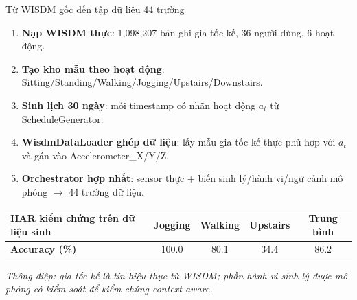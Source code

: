 \documentclass[11pt]{beamer}
\begin{document}
\begin{frame}{Từ WISDM gốc đến tập dữ liệu 44 trường}
\small
\begin{enumerate}
    \item \textbf{Nạp WISDM thực}: 1,098,207 bản ghi gia tốc kế, 36 người dùng, 6 hoạt động.
    \item \textbf{Tạo kho mẫu theo hoạt động}: Sitting/Standing/Walking/Jogging/Upstairs/Downstairs.
    \item \textbf{Sinh lịch 30 ngày}: mỗi timestamp có nhãn hoạt động $a_t$ từ ScheduleGenerator.
    \item \textbf{WisdmDataLoader ghép dữ liệu}: lấy mẫu gia tốc kế thực phù hợp với $a_t$ và gán vào Accelerometer\_X/Y/Z.
    \item \textbf{Orchestrator hợp nhất}: sensor thực + biến sinh lý/hành vi/ngữ cảnh mô phỏng $\rightarrow$ 44 trường dữ liệu.
\end{enumerate}

\vspace{0.05cm}
\begin{table}[h]
\centering
\scriptsize
\begin{tabular}{lcccc}
\toprule
\textbf{HAR kiểm chứng trên dữ liệu sinh} & Jogging & Walking & Upstairs & Trung bình \\
\midrule
\textbf{Accuracy (\%)} & 100.0 & 80.1 & 34.4 & 86.2 \\
\bottomrule
\end{tabular}
\end{table}

\vspace{0.05cm}
\begin{center}
\scriptsize\textit{Thông điệp: gia tốc kế là tín hiệu thực từ WISDM; phần hành vi-sinh lý được mô phỏng có kiểm soát để kiểm chứng context-aware.}
\end{center}
\end{frame}
\end{document}
